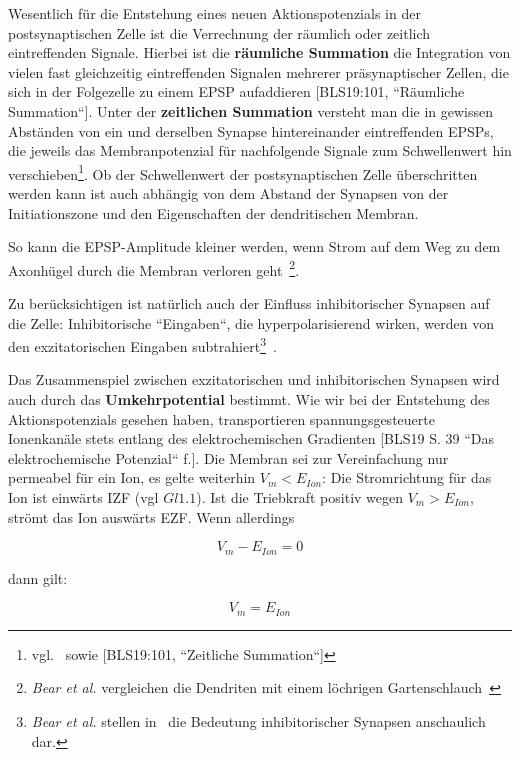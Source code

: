 {{Wesentlich für die Entstehung eines neuen Aktionspotenzials in der postsynaptischen Zelle ist die Verrechnung der räumlich oder zeitlich eintreffenden Signale. 
Hierbei ist die \textbf{räumliche Summation} die Integration von vielen fast gleichzeitig eintreffenden Signalen mehrerer präsynaptischer Zellen, die sich in der Folgezelle zu einem EPSP aufaddieren [BLS19:101, ``Räumliche Summation``]. 
Unter der \textbf{zeitlichen Summation} versteht man die in gewissen Abständen von ein und derselben Synapse hintereinander eintreffenden EPSPs, die jeweils  das Membranpotenzial für nachfolgende Signale zum Schwellenwert hin verschieben\footnote{
 vgl.~\cite[142]{BCP18} sowie [BLS19:101, ``Zeitliche Summation``]
}.
Ob der Schwellenwert der postsynaptischen Zelle überschritten werden kann ist auch abhängig von dem Abstand der Synapsen von der Initiationszone und den Eigenschaften der dendritischen Membran.

So kann die EPSP-Amplitude kleiner werden, wenn Strom auf dem Weg zu dem Axonhügel durch die Membran verloren geht~\cite[142 f.]{BCP18}\footnote{
 \textit{Bear et al.} vergleichen die Dendriten mit einem löchrigen Gartenschlauch~\cite[143]{BCP18}
}.

Zu berücksichtigen ist natürlich auch der Einfluss inhibitorischer Synapsen auf die Zelle: Inhibitorische ``Eingaben``, die hyperpolarisierend wirken, werden von den exzitatorischen Eingaben subtrahiert\footnote{
 \textit{Bear et al.} stellen in~\cite[146, Exkurs 5.6]{BCP18} die Bedeutung inhibitorischer Synapsen anschaulich dar.
}~\cite[225]{KSJ+13}.


Das Zusammenspiel zwischen exzitatorischen und inhibitorischen Synapsen wird auch durch das \textbf{Umkehrpotential} bestimmt. 
Wie wir bei der Entstehung des Aktionspotenzials gesehen haben, transportieren spannungsgesteuerte Ionenkanäle stets entlang des elektrochemischen Gradienten [BLS19 S. 39 ``Das elektrochemische Potenzial`` f.]. 
Die Membran sei zur Vereinfachung nur permeabel für ein Ion, es gelte weiterhin $V_m < E_{Ion}$: Die Stromrichtung für das Ion ist einwärts IZF (vgl $Gl1.1$). Ist die Triebkraft positiv wegen $V_m > E_{Ion}$, strömt das Ion auswärts EZF. Wenn allerdings

\begin{equation}
V_m - E_{Ion} = 0
\end{equation}

dann gilt:

\begin{equation}
V_m = E_{Ion}
\end{equation}

}}
